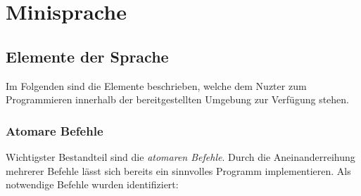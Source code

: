 \section{Minisprache}
\label{sec:implementation:program}

\TODO{}

\subsection{Elemente der Sprache}
\label{sec:implementation:program:elements}

Im Folgenden sind die Elemente beschrieben, welche dem Nuzter zum Programmieren innerhalb der bereitgestellten Umgebung zur Verfügung stehen.

\subsubsection{Atomare Befehle}
\label{sec:implementation:program:elements:cmds}

Wichtigster Bestandteil sind die \emph{atomaren Befehle}. Durch die Aneinanderreihung mehrerer Befehle lässt sich bereits ein sinnvolles Programm implementieren. Als notwendige Befehle wurden identifiziert:



